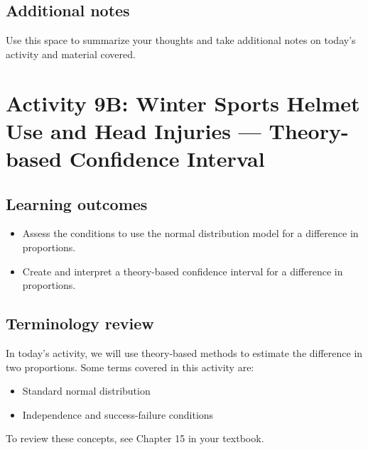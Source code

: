 \documentclass[
]{report}
\begin{document}
\hypertarget{additional-notes-14}{%
\subsection{Additional notes}\label{additional-notes-14}}

Use this space to summarize your thoughts and take additional notes on today's activity and material covered.

\newpage

\hypertarget{activity-9b-winter-sports-helmet-use-and-head-injuries-theory-based-confidence-interval}{%
\section{Activity 9B: Winter Sports Helmet Use and Head Injuries --- Theory-based Confidence Interval}\label{activity-9b-winter-sports-helmet-use-and-head-injuries-theory-based-confidence-interval}}


\hypertarget{learning-outcomes-18}{%
\subsection{Learning outcomes}\label{learning-outcomes-18}}

\begin{itemize}
\item
  Assess the conditions to use the normal distribution model for a difference in proportions.
\item
  Create and interpret a theory-based confidence interval for a difference in proportions.
\end{itemize}

\hypertarget{terminology-review-16}{%
\subsection{Terminology review}\label{terminology-review-16}}

In today's activity, we will use theory-based methods to estimate the difference in two proportions. Some terms covered in this activity are:

\begin{itemize}
\item
  Standard normal distribution
\item
  Independence and success-failure conditions
\end{itemize}

To review these concepts, see Chapter 15 in your textbook.
\end{document}
